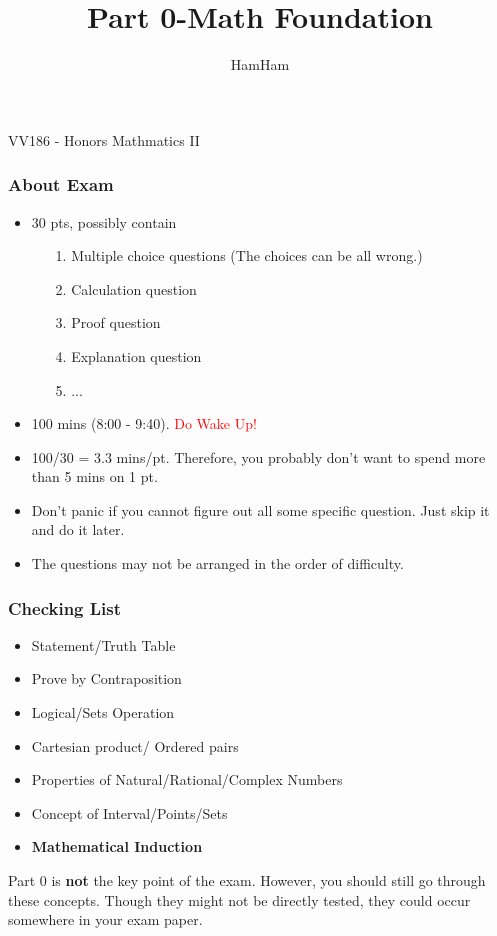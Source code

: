 \documentclass{beamer}
\title{\sffamily Part 0-Math Foundation}
\institute[UM-SJTU JI]{University of Michigan-Shanghai Jiao Tong University Joint Institute}
\author{HamHam}
\newcommand{\myfont}{\rmfamily\normalsize\upshape\mdseries}
\begin{document}
\begin{titlepage}
    \begin{center}
        VV186 - Honors Mathmatics II
    \end{center}
\end{titlepage}
\myfont

\begin{frame}
    \frametitle{About Exam}
    \begin{itemize}
        \item 30 pts, possibly contain
        \begin{itemize}
            \item[1.] Multiple choice questions (The choices can be all wrong.)
            \item[2.] Calculation question
            \item[3.] Proof question 
            \item[4.] Explanation question 
            \item[5.] ...
        \end{itemize}
        \item 100 mins (8:00 - 9:40). \textcolor{red}{Do Wake Up!}
        \item 100/30 = 3.3 mins/pt. Therefore, you probably don’t want to spend more
        than 5 mins on 1 pt.
        \item Don’t panic if you cannot figure out all some specific question. Just skip it
        and do it later.
        \item The questions may not be arranged in the order of difficulty.
    \end{itemize}
\end{frame}
\begin{frame}
    \frametitle{Checking List}
    \begin{itemize}
        \item Statement/Truth Table
        \item Prove by Contraposition
        \item Logical/Sets Operation
        \item Cartesian product/ Ordered pairs
        \item Properties of Natural/Rational/Complex Numbers
        \item Concept of Interval/Points/Sets
        \item \textbf{Mathematical Induction}
    \end{itemize}
    \vspace{1em}\hspace{1em}
    Part 0 is \textbf{not} the key point of the exam. However, you should still go through
these concepts. Though they might not be directly tested, they could occur
somewhere in your exam paper.
\end{frame}
\end{document}
